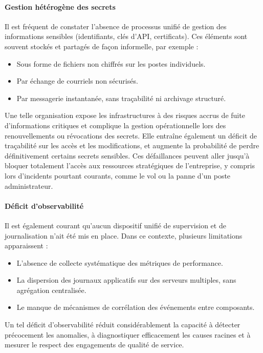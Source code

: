 \paragraph{\textbf{Gestion hétérogène des secrets}}

Il est fréquent de constater l’absence de processus unifié de gestion des informations sensibles (identifiants, clés d’API, certificats). Ces éléments sont souvent stockés et partagés de façon informelle, par exemple :

\begin{itemize}
	\item Sous forme de fichiers non chiffrés sur les postes individuels.
	\item Par échange de courriels non sécurisés.
	\item Par messagerie instantanée, sans traçabilité ni archivage structuré.
\end{itemize}

Une telle organisation expose les infrastructures à des risques accrus de fuite d’informations critiques et complique la gestion opérationnelle lors des renouvellements ou révocations des secrets. Elle entraîne également un déficit de traçabilité sur les accès et les modifications, et augmente la probabilité de perdre définitivement certains secrets sensibles. Ces défaillances peuvent aller jusqu’à bloquer totalement l’accès aux ressources stratégiques de l’entreprise, y compris lors d’incidents pourtant courants, comme le vol ou la panne d’un poste administrateur.

\paragraph{\textbf{Déficit d'observabilité}}

Il est également courant qu’aucun dispositif unifié de supervision et de journalisation n’ait été mis en place. Dans ce contexte, plusieurs limitations apparaissent :

\begin{itemize}
	\item L’absence de collecte systématique des métriques de performance.
	\item La dispersion des journaux applicatifs sur des serveurs multiples, sans agrégation centralisée.
	\item Le manque de mécanismes de corrélation des événements entre composants.
\end{itemize}

Un tel déficit d’observabilité réduit considérablement la capacité à détecter précocement les anomalies, à diagnostiquer efficacement les causes racines et à mesurer le respect des engagements de qualité de service.

